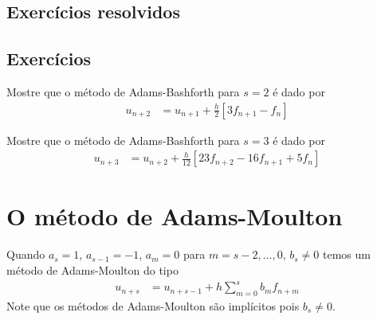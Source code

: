 \subsection*{Exercícios resolvidos}

\emconstrucao

\subsection*{Exercícios}

\begin{exer}
Mostre que o método de Adams-Bashforth para $s=2$ é dado por
\begin{eqnarray}\label{AB2}
  u_{n+2}  &= u_{n+1}  + \frac{h}{2} [3 f_{n+1} -f_{n}]
\end{eqnarray}
\end{exer}

\begin{exer}
Mostre que o método de Adams-Bashforth para $s=3$ é dado por
\begin{eqnarray}\label{AB3}
  u_{n+3}  &= u_{n+2}  + \frac{h}{12} [23f_{n+2}-16 f_{n+1} +5f_{n}]
\end{eqnarray}
\end{exer}




\section{O método de Adams-Moulton}
Quando $a_s=1$, $a_{s-1}=-1$, $a_m=0$ para $m=s-2,\ldots ,0$, $b_s\neq 0$ temos um método de Adams-Moulton do tipo
\begin{eqnarray}\label{AM}
  u_{n+s}  &= u_{n+s-1}  + h \sum_{m=0}^{s} b_m f_{n+m}
\end{eqnarray}
Note que os métodos de Adams-Moulton são implícitos pois $b_s\neq 0$.




